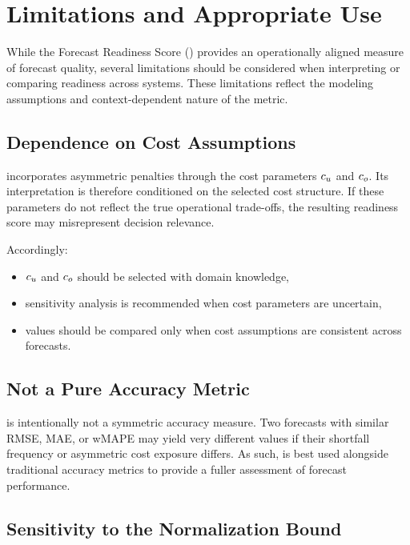 \section{Limitations and Appropriate Use}

While the Forecast Readiness Score (\FRS) provides an operationally aligned
measure of forecast quality, several limitations should be considered when
interpreting or comparing readiness across systems. These limitations reflect
the modeling assumptions and context-dependent nature of the metric.

\subsection{Dependence on Cost Assumptions}

\FRS{} incorporates asymmetric penalties through the cost parameters \(c_u\) and
\(c_o\). Its interpretation is therefore conditioned on the selected cost
structure. If these parameters do not reflect the true operational trade-offs,
the resulting readiness score may misrepresent decision relevance.

Accordingly:

\begin{itemize}
    \item \(c_u\) and \(c_o\) should be selected with domain knowledge,
    \item sensitivity analysis is recommended when cost parameters are uncertain,
    \item \FRS{} values should be compared only when cost assumptions are consistent across forecasts.
\end{itemize}

\subsection{Not a Pure Accuracy Metric}

\FRS{} is intentionally not a symmetric accuracy measure. Two forecasts with
similar RMSE, MAE, or wMAPE may yield very different \FRS{} values if their
shortfall frequency or asymmetric cost exposure differs. As such, \FRS{} is best
used alongside traditional accuracy metrics to provide a fuller assessment of
forecast performance.

\subsection{Sensitivity to the Normalization Bound}

